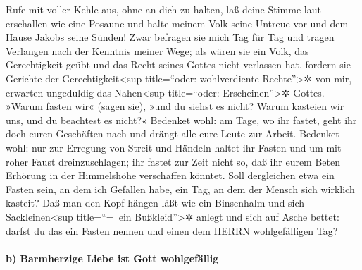 Rufe mit voller Kehle aus, ohne an dich zu halten, laß
deine Stimme laut erschallen wie eine Posaune und halte meinem Volk
seine Untreue vor und dem Hause Jakobs seine Sünden! Zwar
befragen sie mich Tag für Tag und tragen Verlangen nach der Kenntnis
meiner Wege; als wären sie ein Volk, das Gerechtigkeit geübt und das
Recht seines Gottes nicht verlassen hat, fordern sie Gerichte der
Gerechtigkeit\textless sup title=``oder: wohlverdiente
Rechte''\textgreater✲ von mir, erwarten ungeduldig das
Nahen\textless sup title=``oder: Erscheinen''\textgreater✲ Gottes.
»Warum fasten wir« (sagen sie), »und du siehst es nicht?
Warum kasteien wir uns, und du beachtest es nicht?« Bedenket wohl: am
Tage, wo ihr fastet, geht ihr doch euren Geschäften nach und drängt alle
eure Leute zur Arbeit. Bedenket wohl: nur zur Erregung von
Streit und Händeln haltet ihr Fasten und um mit roher Faust
dreinzuschlagen; ihr fastet zur Zeit nicht so, daß ihr eurem Beten
Erhörung in der Himmelshöhe verschaffen könntet. Soll
dergleichen etwa ein Fasten sein, an dem ich Gefallen habe, ein Tag, an
dem der Mensch sich wirklich kasteit? Daß man den Kopf hängen läßt wie
ein Binsenhalm und sich Sackleinen\textless sup title=``=~ein
Bußkleid''\textgreater✲ anlegt und sich auf Asche bettet: darfst du das
ein Fasten nennen und einen dem HERRN wohlgefälligen Tag?

\hypertarget{b-barmherzige-liebe-ist-gott-wohlgefuxe4llig}{%
\paragraph{b) Barmherzige Liebe ist Gott
wohlgefällig}\label{b-barmherzige-liebe-ist-gott-wohlgefuxe4llig}}

